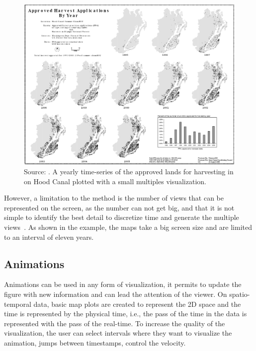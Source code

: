 \begin{figure}
    \centering
    \includegraphics[width = \textwidth]{src/imgs/small-multiples-reference.jpg}
    \caption{Source: \cite{peterson2011small}. A yearly time-series of the approved lands for harvesting in on Hood Canal plotted with a small multiples visualization.}
    \label{fig:small-multiples-reference}
\end{figure}

However, a limitation to the method is the number of views that can be represented on the screen, as the number can not get big, and that it is not simple to identify the best detail to discretize time and generate the multiple views~\cite{Andrienko2003exploratory}.
%
As shown in the example, the  maps take a big screen size and are limited to an interval of eleven years.

\subsection{Animations}

Animations can be used in any form of visualization, it permits to update the figure with new information and can lead the attention of the viewer.
%
On spatio-temporal data, basic map plots are created to represent the 2D space and the time is represented by the physical time, i.e., the pass of the time in the data is represented with the pass of the real-time.
%
To increase the quality of the visualization, the user can select intervals where they want to visualize the animation, jumps between timestamps, control the velocity.
%

